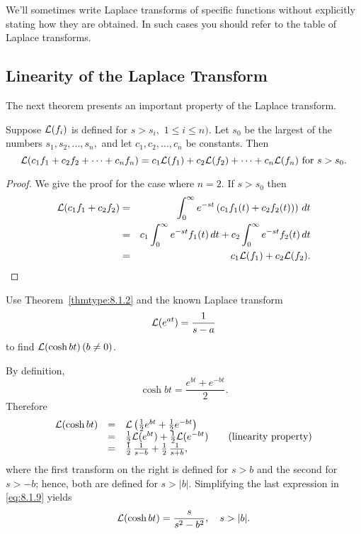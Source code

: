 \documentclass{ximera}
\begin{document}
We'll sometimes write Laplace transforms of specific functions
without explicitly stating how they are obtained. In such cases you
should refer to the table of Laplace transforms.

\subsection*{Linearity of the Laplace Transform}

The next theorem presents an important property of the Laplace
transform.

\begin{theorem}\label{thmtype:8.1.2}
 Suppose ${\cal L}(f_i)$ is defined for
 $s>s_i,$ $1\leq i\leq n)$.
Let $s_0$ be the largest of the numbers $s_1, s_{2}, \dots,s_n,$ and
let
$c_1, c_2,\dots, c_n$ be  constants. Then
$$
{\cal L}(c_1f_1+c_2f_2+\cdots+c_nf_n)=c_1{\cal L}(f_1)+c_2{\cal L}(f_2)
+\cdots+c_n{\cal L}(f_n)\mbox{ for } s>s_0.
$$
\end{theorem}

\begin{proof}
We give the proof for the case where $n=2$. If $s>s_0$ then
\begin{eqnarray*}
{\cal L}(c_1f_1+c_2f_2)&=&
\int_0^\infty
e^{-st}\left(c_1f_1(t)+c_2f_2(t))\right)\,dt\\
&=&c_1\int_0^\infty e^{-st}f_1(t)\,dt+c_2\int_0^\infty e^{-st}f_2(t)\,dt\\
&=&c_1{\cal L}(f_1)+c_2{\cal L}(f_2).
\end{eqnarray*}
\end{proof}

\begin{example}\label{example:8.1.6}
Use  Theorem~\ref{thmtype:8.1.2} and the known Laplace transform
$$
{\cal L}(e^{at})=\frac{1}{s-a}
$$
 to find ${\cal L}(\cosh bt)\,(b\neq 0)$.


\begin{explanation}  By definition,
$$
\cosh bt=\frac{e^{bt}+e^{-bt}}{2}.
$$
Therefore
\begin{equation}\label{eq:8.1.9}
\begin{array}{ccl}
{\cal L}(\cosh bt)&=& {\cal L}\left(\frac{1}{2} e^{bt}+\frac{1}{2}e^{-bt}\right)\\%
&=&\frac{1}{2} {\cal L}(e^{bt}) +\frac{1}{2} {\cal L}(e^{-bt})
\qquad
\mbox{(linearity property)}\\%
&=&\frac{1}{2}\,\frac{1}{s-b} +\frac{1}{2}\,\frac{1}{s+b},
\end{array}
\end{equation}
where the first transform on the right is defined for $s>b$ and the
second
for $s>-b$; hence, both are defined for $s>|b|$.  Simplifying the
last expression in \eqref{eq:8.1.9} yields
$$
{\cal L}(\cosh bt)=\frac{s}{s^2-b^2},\quad s>|b|.
$$
\end{explanation}
\end{example}
\end{document}
